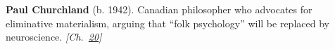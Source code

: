 \textbf{Paul Churchland} (b. 1942). Canadian philosopher who advocates for eliminative materialism, arguing that ``folk psychology'' will be replaced by neuroscience. \emph{[Ch.~\hyperref[ch:chineseroomargument]{20}]}


